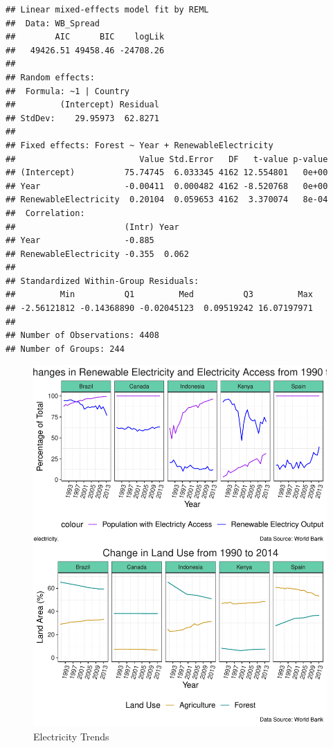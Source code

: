 \documentclass[12pt,]{article}
\begin{document}
\begin{verbatim}
## Linear mixed-effects model fit by REML
##  Data: WB_Spread 
##        AIC      BIC    logLik
##   49426.51 49458.46 -24708.26
## 
## Random effects:
##  Formula: ~1 | Country
##         (Intercept) Residual
## StdDev:    29.95973  62.8271
## 
## Fixed effects: Forest ~ Year + RenewableElectricity 
##                         Value Std.Error   DF   t-value p-value
## (Intercept)          75.74745  6.033345 4162 12.554801   0e+00
## Year                 -0.00411  0.000482 4162 -8.520768   0e+00
## RenewableElectricity  0.20104  0.059653 4162  3.370074   8e-04
##  Correlation: 
##                      (Intr) Year  
## Year                 -0.885       
## RenewableElectricity -0.355  0.062
## 
## Standardized Within-Group Residuals:
##         Min          Q1         Med          Q3         Max 
## -2.56121812 -0.14368890 -0.02045123  0.09519242 16.07197971 
## 
## Number of Observations: 4408
## Number of Groups: 244
\end{verbatim}

\begin{figure}
\centering
\includegraphics{Marx_ENV872_Project_files/figure-latex/unnamed-chunk-11-1.pdf}
\caption{\label{fig:fig6}Electricity Trends}
\end{figure}
\end{document}
